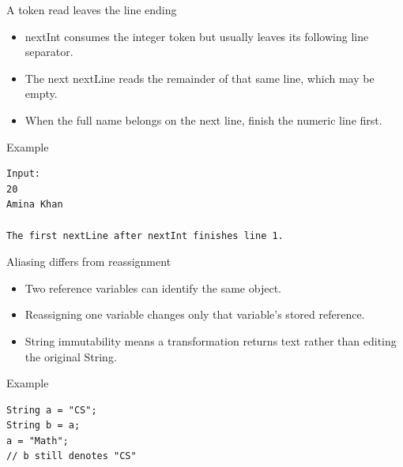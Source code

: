 \documentclass[10pt,aspectratio=169]{beamer}
\begin{document}
\begin{frame}[fragile,t]{A token read leaves the line ending}
\begin{itemize}
\item nextInt consumes the integer token but usually leaves its following line separator.
\item The next nextLine reads the remainder of that same line, which may be empty.
\item When the full name belongs on the next line, finish the numeric line first.
\end{itemize}
\vspace{1mm}\begin{block}{Example}
\begin{lstlisting}
Input:
20
Amina Khan

The first nextLine after nextInt finishes line 1.
\end{lstlisting}
\end{block}
\end{frame}

\begin{frame}[fragile,t]{Aliasing differs from reassignment}
\begin{itemize}
\item Two reference variables can identify the same object.
\item Reassigning one variable changes only that variable's stored reference.
\item String immutability means a transformation returns text rather than editing the original String.
\end{itemize}
\vspace{1mm}\begin{block}{Example}
\begin{lstlisting}
String a = "CS";
String b = a;
a = "Math";
// b still denotes "CS"
\end{lstlisting}
\end{block}
\end{frame}
\end{document}
